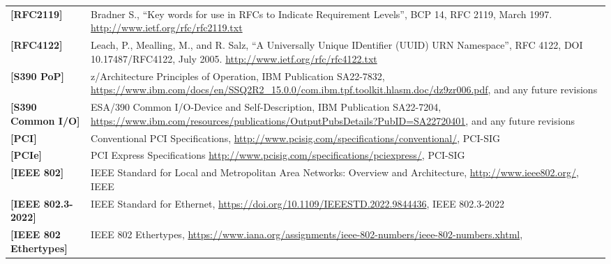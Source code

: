\begin{longtable}{l p{5in}}
	\label{intro:rfc2119}\textbf{[RFC2119]} &
Bradner S., ``Key words for use in RFCs to Indicate Requirement
Levels'', BCP 14, RFC 2119, March 1997. \newline\url{http://www.ietf.org/rfc/rfc2119.txt}\\
	\label{intro:rfc4122}\textbf{[RFC4122]} &
Leach, P., Mealling, M., and R. Salz, ``A Universally Unique
IDentifier (UUID) URN Namespace'', RFC 4122, DOI 10.17487/RFC4122,
July 2005. \newline\url{http://www.ietf.org/rfc/rfc4122.txt}\\
	\label{intro:S390 PoP}\textbf{[S390 PoP]} & z/Architecture Principles of Operation, IBM Publication SA22-7832, \newline\url{https://www.ibm.com/docs/en/SSQ2R2_15.0.0/com.ibm.tpf.toolkit.hlasm.doc/dz9zr006.pdf}, and any future revisions\\
	\label{intro:S390 Common I/O}\textbf{[S390
Common I/O]} & ESA/390 Common I/O-Device and Self-Description, IBM Publication SA22-7204, \newline\url{https://www.ibm.com/resources/publications/OutputPubsDetails?PubID=SA22720401}, and any future revisions\\
	\label{intro:PCI}\textbf{[PCI]} &
	Conventional PCI Specifications,
	\newline\url{http://www.pcisig.com/specifications/conventional/},
	PCI-SIG\\
	\label{intro:PCIe}\textbf{[PCIe]} &
	PCI Express Specifications
	\newline\url{http://www.pcisig.com/specifications/pciexpress/},
	PCI-SIG\\
	\label{intro:IEEE 802}\textbf{[IEEE 802]} &
	IEEE Standard for Local and Metropolitan Area Networks: Overview and Architecture,
	\newline\url{http://www.ieee802.org/},
	IEEE\\
	\label{intro:IEEE 802.3-2022}\textbf{[IEEE 802.3-2022]} &
	IEEE Standard for Ethernet,
	\newline\url{https://doi.org/10.1109/IEEESTD.2022.9844436},
	IEEE 802.3-2022\\
	\label{intro:IEEE 802 Ethertypes}\textbf{[IEEE 802 Ethertypes]} &
	IEEE 802 Ethertypes,
	\newline\url{https://www.iana.org/assignments/ieee-802-numbers/ieee-802-numbers.xhtml},

\end{longtable}

